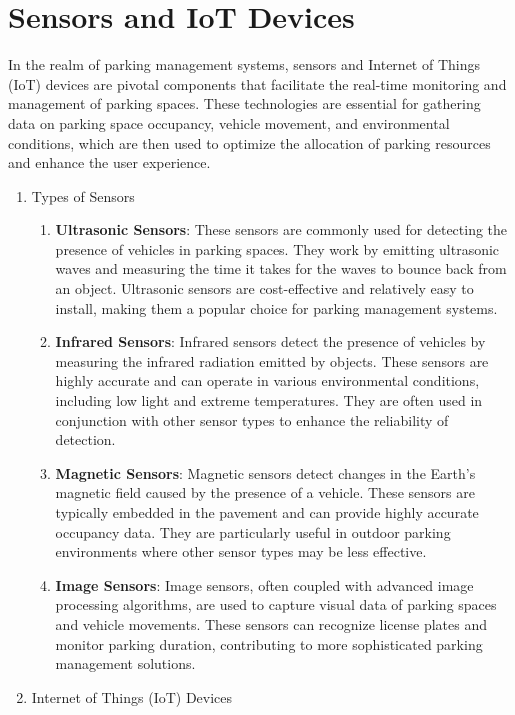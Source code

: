 \documentclass[oneside, 12pt, a4paper, draft]{book}
\begin{document}
\section{Sensors and IoT Devices}
\label{sec:org189c715}

In the realm of parking management systems, sensors and Internet of Things (IoT) devices are pivotal components that facilitate the real-time monitoring and management of parking spaces. These technologies are essential for gathering data on parking space occupancy, vehicle movement, and environmental conditions, which are then used to optimize the allocation of parking resources and enhance the user experience.
\begin{enumerate}
\item Types of Sensors
\label{sec:orgd46063c}

\begin{enumerate}
\item \textbf{Ultrasonic Sensors}: These sensors are commonly used for detecting the presence of vehicles in parking spaces. They work by emitting ultrasonic waves and measuring the time it takes for the waves to bounce back from an object. Ultrasonic sensors are cost-effective and relatively easy to install, making them a popular choice for parking management systems.

\item \textbf{Infrared Sensors}: Infrared sensors detect the presence of vehicles by measuring the infrared radiation emitted by objects. These sensors are highly accurate and can operate in various environmental conditions, including low light and extreme temperatures. They are often used in conjunction with other sensor types to enhance the reliability of detection.

\item \textbf{Magnetic Sensors}: Magnetic sensors detect changes in the Earth's magnetic field caused by the presence of a vehicle. These sensors are typically embedded in the pavement and can provide highly accurate occupancy data. They are particularly useful in outdoor parking environments where other sensor types may be less effective.

\item \textbf{Image Sensors}: Image sensors, often coupled with advanced image processing algorithms, are used to capture visual data of parking spaces and vehicle movements. These sensors can recognize license plates and monitor parking duration, contributing to more sophisticated parking management solutions.
\end{enumerate}
\item Internet of Things (IoT) Devices
\label{sec:org8c114d7}


\end{enumerate}
\end{document}

